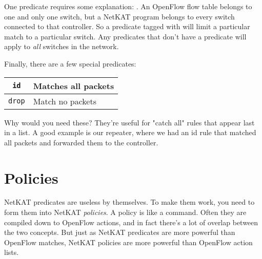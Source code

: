 One predicate requires some explanation: .  
An OpenFlow flow table belongs to one and only one switch, but a NetKAT program belongs to every
switch connected to that controller.  
So a predicate tagged with  will limit a particular match to a particular switch.
Any predicates that don't have a  predicate will apply to \textit{all} switches in the network.

Finally, there are a few special predicates:

\bigskip
\begin{tabularx}{6in}{|c|X|}
\hline\hline
\texttt{id} & Matches all packets
\\ \hline  
\texttt{drop} & Match no packets
\\ \hline\hline
\end{tabularx}
\bigskip

Why would you need these?  
They're useful for "catch all" rules that appear last in a list.
A good example is our repeater, where we had an id rule that matched all packets and
forwarded them to the controller.

\section{Policies}

NetKAT predicates are useless by themselves.  
To make them work, you need to form them into NetKAT \textit{policies}.
A policy is like a command.  
Often they are compiled down to OpenFlow actions, and in fact there's a lot of overlap between the two
concepts.
But just as NetKAT predicates are more powerful than OpenFlow matches, NetKAT policies are more
powerful than OpenFlow action lists.


